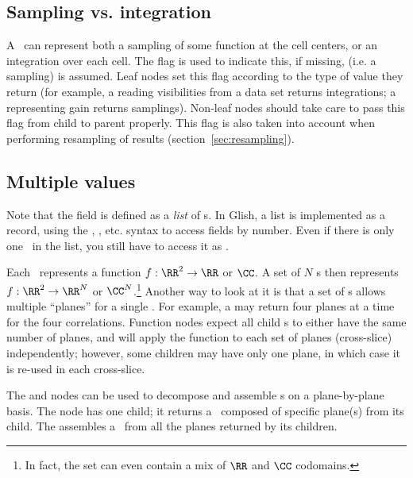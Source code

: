 \subsection{Sampling vs. integration}
  \label{sec:integration}
  
  A \Result\ can represent both a sampling of some function at the cell
  centers, or an integration over each cell. The  flag is used
  to indicate this, if missing,  (i.e. a sampling) is assumed. Leaf
  nodes set this flag according to the type of value they return (for example,
  a  reading visibilities from a data set returns integrations; a
   representing gain returns samplings). Non-leaf nodes should take
  care to pass this flag from child to parent properly. This flag is also taken
  into account when performing resampling of results
  (section~\ref{sec:resampling}).

\subsection{Multiple values}
  
  Note that the  field is defined as a {\em list} of \VellSet{}s. In
  Glish, a list is implemented as a record, using the , ,
  etc. syntax to access fields by number. Even if there is only one \VellSet\
  in the list, you still have to access it as .

  Each \VellSet\ represents a function $f:\RR^2\rightarrow\RR$ or $\CC$. A set
  of $N$ \VellSet{}s then represents $f:\RR^2\rightarrow\RR^{N}$ or
  $\CC^{N}$.\footnote{In fact, the set can even contain a mix of $\RR$ and
  $\CC$ codomains.} Another way to look at it is that a set of \VellSet{}s
  allows multiple ``planes'' for a single \Cells. For example, a 
  may return four planes at a time for the four correlations. Function nodes
  expect all child \Result{}s to either have the same number of planes, and
  will apply the function to each set of planes (cross-slice) independently;
  however, some children may have only one plane, in which case it is re-used
  in each cross-slice.

  The  and  nodes can be used to decompose and
  assemble \Result{}s on a plane-by-plane basis. The \qq{Selector} node has one
  child; it returns a \Result\ composed of specific plane(s) from its child. The
  \qq{Composer} assembles a \Result\ from all the planes returned by its
  children.

